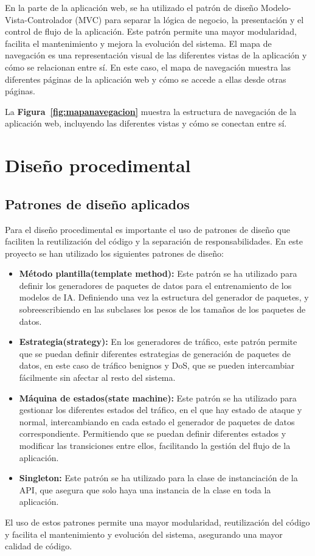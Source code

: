 En la parte de la aplicación web, se ha utilizado el patrón de diseño Modelo-Vista-Controlador (MVC) para separar la lógica de negocio, la presentación y el control de flujo de la aplicación. Este patrón permite una mayor modularidad, facilita el mantenimiento y mejora la evolución del sistema. 
El mapa de navegación es una representación visual de las diferentes vistas de la aplicación y cómo se relacionan entre sí. En este caso, el mapa de navegación muestra las diferentes páginas de la aplicación web y cómo se accede a ellas desde otras páginas.

La \textbf{Figura~\ref{fig:mapanavegacion}} muestra la estructura de navegación de la aplicación web, incluyendo las diferentes vistas y cómo se conectan entre sí.

\section{Diseño procedimental}

\subsection{Patrones de diseño aplicados}
Para el diseño procedimental es importante el uso de patrones de diseño que faciliten la reutilización del código y la separación de responsabilidades. En este proyecto se han utilizado los siguientes patrones de diseño:
\begin{itemize}
    \item \textbf{Método plantilla(template method): } Este patrón se ha utilizado para definir los generadores de paquetes de datos para el entrenamiento de los modelos de IA. Definiendo una vez la estructura del generador de paquetes, y sobreescribiendo en las subclases los pesos de los tamaños de los paquetes de datos.
    \item \textbf{Estrategia(strategy): } En los generadores de tráfico, este patrón permite que se puedan definir diferentes estrategias de generación de paquetes de datos, en este caso de tráfico benignos y DoS, que se pueden intercambiar fácilmente sin afectar al resto del sistema.
    \item \textbf{Máquina de estados(state machine): } Este patrón se ha utilizado para gestionar los diferentes estados del tráfico, en el que hay estado de ataque y normal, intercambiando en cada estado el generador de paquetes de datos correspondiente. Permitiendo que se puedan definir diferentes estados y modificar las transiciones entre ellos, facilitando la gestión del flujo de la aplicación.
    \item \textbf{Singleton: } Este patrón se ha utilizado para la clase de instanciación de la API, que asegura que solo haya una instancia de la clase en toda la aplicación.
\end{itemize}
El uso de estos patrones permite una mayor modularidad, reutilización del código y facilita el mantenimiento y evolución del sistema, asegurando una mayor calidad de código.
